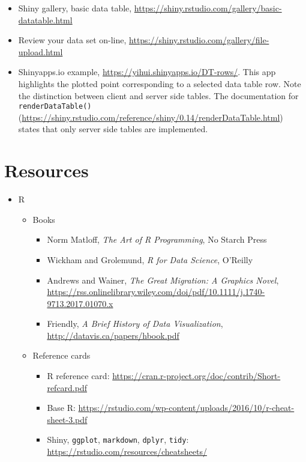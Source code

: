 \documentclass[10pt, letterpaper]{article}
\begin{document}
\begin{spacing}{1.0}
\begin{itemize}
    \item Shiny gallery, basic data table, \url{https://shiny.rstudio.com/gallery/basic-datatable.html}
    
    \item Review your data set on-line, \url{https://shiny.rstudio.com/gallery/file-upload.html}
    
    \item Shinyapps.io example, \url{https://yihui.shinyapps.io/DT-rows/}.  This app highlights the plotted point corresponding to a selected data table row.  Note the distinction between client and server side tables.  The documentation for \texttt{renderDataTable()} (\url{https://shiny.rstudio.com/reference/shiny/0.14/renderDataTable.html}) states that only server side tables are implemented.
    
\end{itemize}


\section{Resources}\label{sec:resources}

\begin{itemize}

  \item R
    \begin{itemize}   
      \item Books
        \begin{itemize}
          \item Norm Matloff, \textit{The Art of R Programming}, No Starch Press
          \item Wickham and Grolemund, \textit{R for Data Science}, O'Reilly
          \item Andrews and Wainer, \textit{The Great Migration:  A Graphics Novel}, \url{https://rss.onlinelibrary.wiley.com/doi/pdf/10.1111/j.1740-9713.2017.01070.x}
          \item Friendly, \textit{A Brief History of Data Visualization}, \url{http://datavis.ca/papers/hbook.pdf}
        \end{itemize}
      \item Reference cards
        \begin{itemize}
          \item R reference card:  \url{https://cran.r-project.org/doc/contrib/Short-refcard.pdf}
          \item Base R:  \url{https://rstudio.com/wp-content/uploads/2016/10/r-cheat-sheet-3.pdf}
          \item Shiny, \texttt{ggplot}, \texttt{markdown}, \texttt{dplyr}, \texttt{tidy}: \url{https://rstudio.com/resources/cheatsheets/}
        \end{itemize}
    \end{itemize}


\end{itemize}
\end{spacing}
\end{document}
